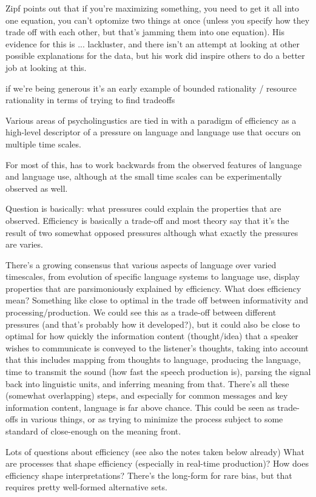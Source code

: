 \documentclass[]{article}
\begin{document}
Zipf points out that if you're maximizing something, you need to get it all into one equation, you can't optomize two things at once (unless you specify how they trade off with each other, but that's jamming them into one equation). His evidence for this is ... lackluster, and there isn't an attempt at looking at other possible explanations for the data, but his work did inspire others to do a better job at looking at this. 

\cite{zipf1949} if we're being generous it's an early example of bounded rationality / resource rationality in terms of trying to find tradeoffs 

Various areas of psycholingustics are tied in with a paradigm of efficiency as a high-level descriptor of a pressure on language and language use that occurs on multiple time scales. 

For most of this, has to work backwards from the observed features of language and language use, although at the small time scales can be experimentally observed as well. 

Question is basically: what pressures could explain the properties that are observed. Efficiency is basically a trade-off and most theory say that it's the result of two somewhat opposed pressures although what exactly the pressures are varies. 


There's a growing consensus that various aspects of language over varied timescales, from evolution of specific language systems to language use, display properties that are parsimoniously explained by efficiency. What does efficiency mean? Something like close to optimal in the trade off between informativity and processing/production. We could see this as a trade-off between different pressures (and that's probably how it developed?), but it could also be close to optimal for how quickly the information content (thought/idea) that a speaker wishes to communicate is conveyed to the listener's thoughts, taking into account that this includes mapping from thoughts to language, producing the language, time to transmit the sound (how fast the speech production is), parsing the signal back into linguistic units, and inferring meaning from that. There's all these (somewhat overlapping) steps, and especially for common messages and key information content, language is far above chance. This could be seen as trade-offs in various things, or as trying to minimize the process subject to some standard of close-enough on the meaning front. 


Lots of questions about efficiency (see also the notes taken below already)
What are processes that shape efficiency (especially in real-time production)? How does efficiency shape interpretations? There's the long-form for rare bias, but that requires pretty well-formed alternative sets. 
\end{document}
